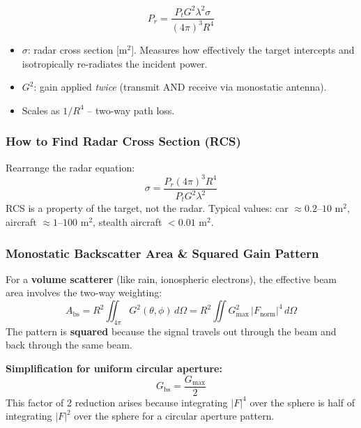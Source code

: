 \documentclass[10pt,letterpaper]{article}
\begin{document}
\begin{tcolorbox}[formulabox, title={Radar Equation}]
\begin{equation}
  P_r = \frac{P_t G^2\lambda^2\sigma}{(4\pi)^3 R^4}
\end{equation}
\begin{itemize}[noitemsep]
  \item $\sigma$: radar cross section [m$^2$]. Measures how effectively the target intercepts and isotropically re-radiates the incident power.
  \item $G^2$: gain applied \emph{twice} (transmit AND receive via monostatic antenna).
  \item Scales as $1/R^4$ -- two-way path loss.
\end{itemize}
\end{tcolorbox}

\subsubsection{How to Find Radar Cross Section (RCS)}
Rearrange the radar equation:
\begin{equation}
  \sigma = \frac{P_r(4\pi)^3 R^4}{P_t G^2\lambda^2}
\end{equation}
RCS is a property of the target, not the radar. Typical values: car $\approx 0.2$--$10$ m$^2$, aircraft $\approx 1$--$100$ m$^2$, stealth aircraft $< 0.01$ m$^2$.

\subsubsection{Monostatic Backscatter Area \& Squared Gain Pattern}
For a \textbf{volume scatterer} (like rain, ionospheric electrons), the effective beam area involves the two-way weighting:
\begin{equation}
  A_\mathrm{bs} = R^2\iint_{4\pi} G^2(\theta,\phi)\,d\Omega = R^2\iint G_\mathrm{max}^2\,|F_\mathrm{norm}|^4\,d\Omega
\end{equation}
The pattern is \textbf{squared} because the signal travels out through the beam and back through the same beam.

\textbf{Simplification for uniform circular aperture:}
\begin{equation}
  G_\mathrm{bs} = \frac{G_\mathrm{max}}{2}
\end{equation}
This factor of 2 reduction arises because integrating $|F|^4$ over the sphere is half of integrating $|F|^2$ over the sphere for a circular aperture pattern.
\end{document}
